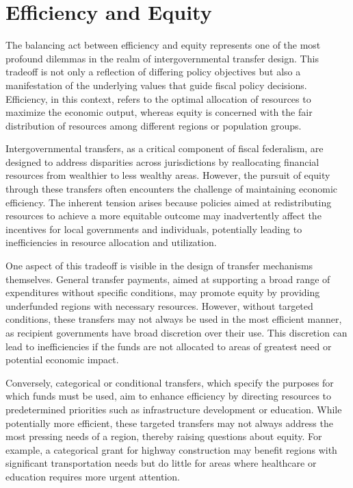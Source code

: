 \section{Efficiency and Equity}

The balancing act between efficiency and equity represents one of the most profound dilemmas in the realm of intergovernmental transfer design. This tradeoff is not only a reflection of differing policy objectives but also a manifestation of the underlying values that guide fiscal policy decisions. Efficiency, in this context, refers to the optimal allocation of resources to maximize the economic output, whereas equity is concerned with the fair distribution of resources among different regions or population groups.

Intergovernmental transfers, as a critical component of fiscal federalism, are designed to address disparities across jurisdictions by reallocating financial resources from wealthier to less wealthy areas. However, the pursuit of equity through these transfers often encounters the challenge of maintaining economic efficiency. The inherent tension arises because policies aimed at redistributing resources to achieve a more equitable outcome may inadvertently affect the incentives for local governments and individuals, potentially leading to inefficiencies in resource allocation and utilization.

One aspect of this tradeoff is visible in the design of transfer mechanisms themselves. General transfer payments, aimed at supporting a broad range of expenditures without specific conditions, may promote equity by providing underfunded regions with necessary resources. However, without targeted conditions, these transfers may not always be used in the most efficient manner, as recipient governments have broad discretion over their use. This discretion can lead to inefficiencies if the funds are not allocated to areas of greatest need or potential economic impact.

Conversely, categorical or conditional transfers, which specify the purposes for which funds must be used, aim to enhance efficiency by directing resources to predetermined priorities such as infrastructure development or education. While potentially more efficient, these targeted transfers may not always address the most pressing needs of a region, thereby raising questions about equity. For example, a categorical grant for highway construction may benefit regions with significant transportation needs but do little for areas where healthcare or education requires more urgent attention.


